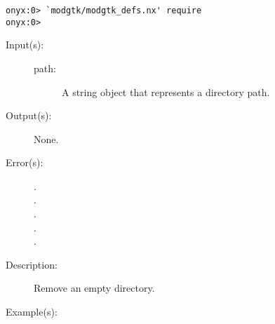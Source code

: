 \begin{description}
\begin{description}
\begin{verbatim}
onyx:0> `modgtk/modgtk_defs.nx' require
onyx:0>
	\end{verbatim}
	\end{description}
\label{systemdict:rmdir}
\item[{\onyxop{path}{rmdir}{--}}: ]
	\begin{description}\item[]
	\item[Input(s): ]
		\begin{description}\item[]
		\item[path: ]
			A string object that represents a directory path.
		\end{description}
	\item[Output(s): ] None.
	\item[Error(s): ]
		\begin{description}\item[]
		\item[.]
		\item[.]
		\item[.]
		\item[.]
		\item[.]
		\end{description}
	\item[Description: ]
		Remove an empty directory.
	\item[Example(s): ]\begin{verbatim}


\end{verbatim}
\end{description}
\end{description}
